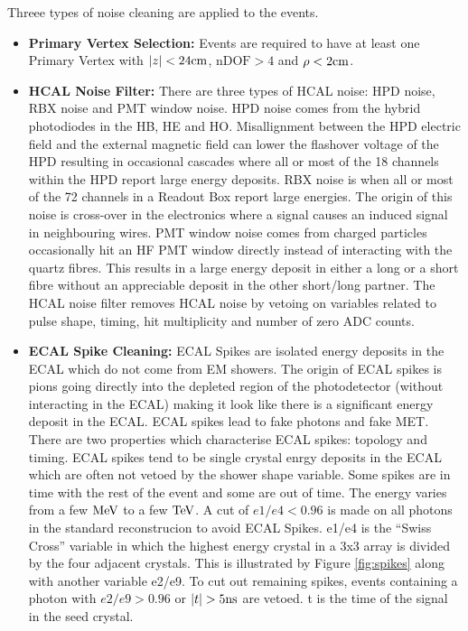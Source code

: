 Threee types of noise cleaning are applied to the events. 
\begin{itemize}
\item {\bf Primary Vertex Selection:} Events are required to have at least one
Primary Vertex with $|z| < 24\mbox{cm}$, $\mbox{nDOF} > 4$ and $\rho < 2\mbox{cm}$.
\item {\bf HCAL Noise Filter:} There are three types of HCAL noise: HPD noise, 
RBX noise and PMT window noise. HPD noise comes from the hybrid photodiodes in
the HB, HE and HO. Misallignment between the HPD electric field and the external
magnetic field can lower the flashover voltage of the HPD resulting in 
occasional cascades where all or most of the 18 channels within the HPD report
large energy deposits. RBX noise is when all or most of the 72 channels in a
Readout Box report large energies. The origin of this noise is cross-over in the
electronics where a signal causes an induced signal in neighbouring wires.
PMT window noise comes from charged particles occasionally hit an HF PMT window 
directly instead of interacting with the quartz fibres. This results in a large 
energy deposit in either a long or a short fibre without an appreciable deposit 
in the other short/long partner. The HCAL noise filter removes HCAL noise by 
vetoing on variables related to pulse shape, timing, hit multiplicity and number
of zero ADC counts.
\item {\bf ECAL Spike Cleaning:} ECAL Spikes are isolated energy deposits in 
the ECAL which do not come from EM showers. The origin of ECAL spikes is pions
going directly into the depleted region of the photodetector (without
interacting in the ECAL) making it look like there is a significant energy 
deposit in the ECAL. ECAL spikes lead to fake photons and fake MET. There are 
two properties which characterise ECAL spikes: topology and timing. ECAL spikes 
tend to be single crystal enrgy deposits in the ECAL which are often not vetoed 
by the shower shape variable. Some spikes are in time with the rest of the event 
and some are out of time. The energy varies from a few $\mbox{MeV}$ to a few $\mbox{TeV}$. A 
cut of $e1/e4 < 0.96$ is made on all photons in the standard reconstrucion to 
avoid ECAL Spikes. e1/e4 is the ``Swiss Cross'' variable in which the highest
energy crystal in a 3x3 array is divided by the four adjacent crystals. This is
illustrated by Figure \ref{fig:spikes} along with another variable e2/e9. To cut 
out remaining spikes, events containing a photon with $e2/e9 > 0.96$ or $|t| > 
5\mbox{ns}$ are vetoed. t is the time of the signal in the seed crystal.
\end{itemize}

